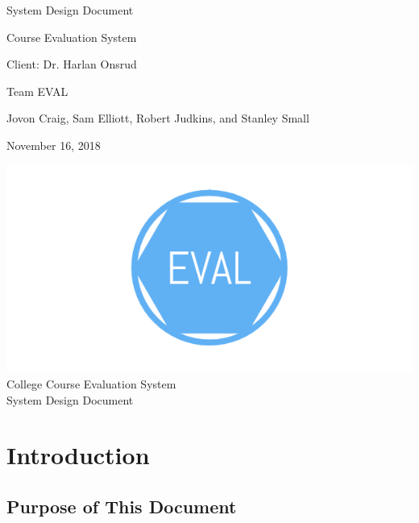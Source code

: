 \documentclass{article}
\begin{document}
\begin{titlepage}

\centering
\vspace*{2cm}
{\Huge System Design Document\par}
\vspace{1cm}
{\LARGE Course Evaluation System\par}
\vspace{1cm}
{\Large Client: Dr. Harlan Onsrud\par}
\vspace{1cm}
{\Large Team EVAL\par}
\vspace{.2cm}
{\Large Jovon Craig, Sam Elliott, Robert Judkins, and Stanley Small\par}
\vspace{1cm}
{\Large November 16, 2018\par}
\vspace{.5cm}

\end{titlepage}

\newpage

\begin{center}
{\includegraphics[scale=.2]{images/team_logo.png}} \\ 	\bigskip
{\LARGE College Course Evaluation System } \\ \medskip
{\large System Design Document } \\ \medskip
\end{center}

\tableofcontents

\newpage

\section{Introduction}
\subsection{Purpose of This Document}
\end{document}
